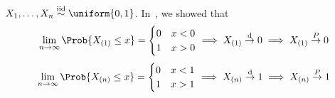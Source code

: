 \begin{Example}{}{}
    $ X_1,\ldots,X_n \stackrel{\text{iid}}{\sim}\uniform{0,1} $.
    In~, we showed that
    \[ \lim\limits_{{n} \to {\infty}} \Prob{X_{(1)}\le x}=
        \begin{cases}
            0 & x<0 \\
            1 & x>0
        \end{cases}\implies X_{(1)}\stackrel{\text{d}}{\to}0
        \implies X_{(1)}\stackrel{\mathbb{P}}{\to}0 \]
    \[ \lim\limits_{{n} \to {\infty}} \Prob{X_{(n)}\le x}=
        \begin{cases}
            0 & x<1 \\
            1 & x>1
        \end{cases}\implies X_{(n)}\stackrel{\text{d}}{\to}1\implies
        X_{(n)}\stackrel{\mathbb{P}}{\to}1 \]
\end{Example}
